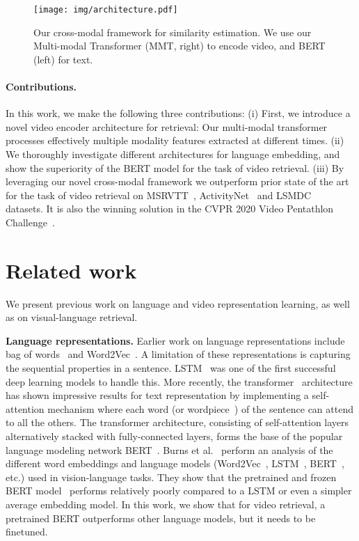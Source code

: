 \documentclass[runningheads]{llncs}
\begin{document}
\begin{figure*}[t]
\begin{center}
\texttt{[image: img/architecture.pdf]}
\end{center}
   \caption{Our cross-modal framework for similarity estimation. We use our Multi-modal Transformer (MMT, right) to encode video, and BERT (left) for text.}
\label{fig:architecture}
\end{figure*}

\paragraph{Contributions.}
 In this work, we make the following three contributions:
(i) First, we introduce a novel video encoder architecture for retrieval: Our multi-modal transformer processes effectively multiple modality features extracted at different times.
(ii) We thoroughly investigate different architectures for language embedding, and show the superiority of the BERT model for the task of video retrieval. (iii) By leveraging our novel cross-modal framework we outperform prior state of the art for the task of video retrieval on MSRVTT~\cite{xu2016msrvtt}, ActivityNet~\cite{krishna2017activitynet} and LSMDC~\cite{Rohrbach2015LSMDC} datasets. It is also the winning solution in the CVPR 2020 Video Pentathlon Challenge~\cite{Gabeur2020Challenge}.


 
\section{Related work}

We present previous work on language and video representation learning, as well as on visual-language retrieval.

\vspace{0.2cm}
\noindent \textbf{Language representations.} 
Earlier work on language representations include bag of words~\cite{Zhang2010BagOfWords} and Word2Vec~\cite{Mikolov2013Word2Vec}. A limitation of these representations is capturing the sequential properties in a sentence. LSTM~\cite{Hochreiter1997lstm} was one of the first successful deep learning models to handle this. More recently, the transformer~\cite{vaswani2017transformer} architecture has shown impressive results for text representation by implementing a self-attention mechanism where each word (or wordpiece~\cite{Wu2016Wordpiece}) of the sentence can attend to all the others. The transformer architecture, consisting of self-attention layers alternatively stacked with fully-connected layers, forms the base of the popular language modeling network BERT~\cite{devlin2018bert}. Burns et al.~\cite{burns2019language} perform an analysis of the different word embeddings and language models (Word2Vec~\cite{Mikolov2013Word2Vec}, LSTM~\cite{Hochreiter1997lstm}, BERT~\cite{devlin2018bert}, etc.) used in vision-language tasks.
They show that the pretrained and frozen BERT model~\cite{devlin2018bert} performs relatively poorly compared to a LSTM or even a simpler average embedding model. In this work, we show that for video retrieval, a pretrained BERT outperforms other language models, but it needs to be finetuned.
\end{document}
